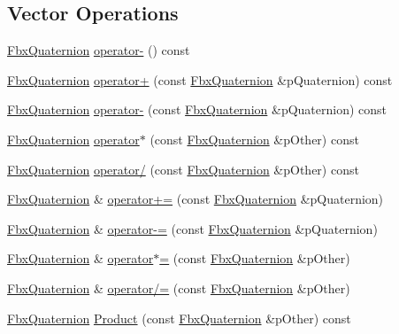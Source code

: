 \subsection*{Vector Operations}
\begin{DoxyCompactItemize}
\item 
\hyperlink{class_fbx_quaternion}{Fbx\+Quaternion} \hyperlink{class_fbx_quaternion_ab6c1bcdc81e7f898a10efbe01fc469d9}{operator-\/} () const
\item 
\hyperlink{class_fbx_quaternion}{Fbx\+Quaternion} \hyperlink{class_fbx_quaternion_ae4b5759bbd1b61bc49a4aeb2a1f92fae}{operator+} (const \hyperlink{class_fbx_quaternion}{Fbx\+Quaternion} \&p\+Quaternion) const
\item 
\hyperlink{class_fbx_quaternion}{Fbx\+Quaternion} \hyperlink{class_fbx_quaternion_abd969b5c185fc64c2784ed938436294f}{operator-\/} (const \hyperlink{class_fbx_quaternion}{Fbx\+Quaternion} \&p\+Quaternion) const
\item 
\hyperlink{class_fbx_quaternion}{Fbx\+Quaternion} \hyperlink{class_fbx_quaternion_a7a8b347ccf0048f71a5e882705c00d04}{operator$\ast$} (const \hyperlink{class_fbx_quaternion}{Fbx\+Quaternion} \&p\+Other) const
\item 
\hyperlink{class_fbx_quaternion}{Fbx\+Quaternion} \hyperlink{class_fbx_quaternion_aeb9ff1e0023e789f0e2cb872116401f6}{operator/} (const \hyperlink{class_fbx_quaternion}{Fbx\+Quaternion} \&p\+Other) const
\item 
\hyperlink{class_fbx_quaternion}{Fbx\+Quaternion} \& \hyperlink{class_fbx_quaternion_a1bf1954c2f12e9dd4f4403b117263bd6}{operator+=} (const \hyperlink{class_fbx_quaternion}{Fbx\+Quaternion} \&p\+Quaternion)
\item 
\hyperlink{class_fbx_quaternion}{Fbx\+Quaternion} \& \hyperlink{class_fbx_quaternion_a2166c06ff00f0a768b3be0c64ebc919a}{operator-\/=} (const \hyperlink{class_fbx_quaternion}{Fbx\+Quaternion} \&p\+Quaternion)
\item 
\hyperlink{class_fbx_quaternion}{Fbx\+Quaternion} \& \hyperlink{class_fbx_quaternion_a8d6842472f5712ab72fcdbe3ec4fe093}{operator$\ast$=} (const \hyperlink{class_fbx_quaternion}{Fbx\+Quaternion} \&p\+Other)
\item 
\hyperlink{class_fbx_quaternion}{Fbx\+Quaternion} \& \hyperlink{class_fbx_quaternion_a34cc4ef2a5eddb5546a223d7d85a9d6c}{operator/=} (const \hyperlink{class_fbx_quaternion}{Fbx\+Quaternion} \&p\+Other)
\item 
\hyperlink{class_fbx_quaternion}{Fbx\+Quaternion} \hyperlink{class_fbx_quaternion_a4b915abc82fa0199c15f07fa3814a3ec}{Product} (const \hyperlink{class_fbx_quaternion}{Fbx\+Quaternion} \&p\+Other) const

\end{DoxyCompactItemize}
